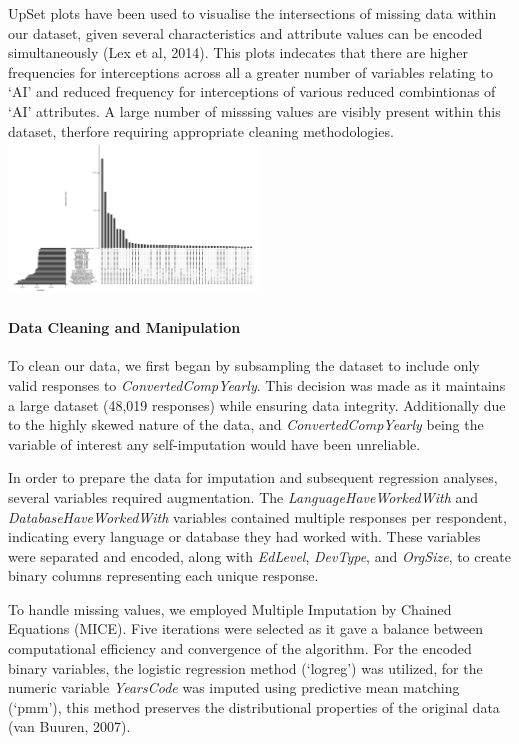 \documentclass[
  12pt,
]{article}
\begin{document}
UpSet plots have been used to visualise the intersections of missing
data within our dataset, given several characteristics and attribute
values can be encoded simultaneously (Lex et al, 2014). This plots
indecates that there are higher frequencies for interceptions across all
a greater number of variables relating to `AI' and reduced frequency for
interceptions of various reduced combintionas of `AI' attributes. A
large number of misssing values are visibly present within this dataset,
therfore requiring appropriate cleaning methodologies.
\includegraphics[width=0.5\textwidth,height=0.5\textheight]{Missing_values_upset.png}

\hypertarget{data-cleaning-and-manipulation}{%
\paragraph{Data Cleaning and
Manipulation}\label{data-cleaning-and-manipulation}}

To clean our data, we first began by subsampling the dataset to include
only valid responses to \emph{ConvertedCompYearly}. This decision was
made as it maintains a large dataset (48,019 responses) while ensuring
data integrity. Additionally due to the highly skewed nature of the
data, and \emph{ConvertedCompYearly} being the variable of interest any
self-imputation would have been unreliable.

In order to prepare the data for imputation and subsequent regression
analyses, several variables required augmentation. The
\emph{LanguageHaveWorkedWith} and \emph{DatabaseHaveWorkedWith}
variables contained multiple responses per respondent, indicating every
language or database they had worked with. These variables were
separated and encoded, along with \emph{EdLevel}, \emph{DevType}, and
\emph{OrgSize}, to create binary columns representing each unique
response.

To handle missing values, we employed Multiple Imputation by Chained
Equations (MICE). Five iterations were selected as it gave a balance
between computational efficiency and convergence of the algorithm. For
the encoded binary variables, the logistic regression method (`logreg')
was utilized, for the numeric variable \emph{YearsCode} was imputed
using predictive mean matching (`pmm'), this method preserves the
distributional properties of the original data (van Buuren, 2007).
\end{document}
